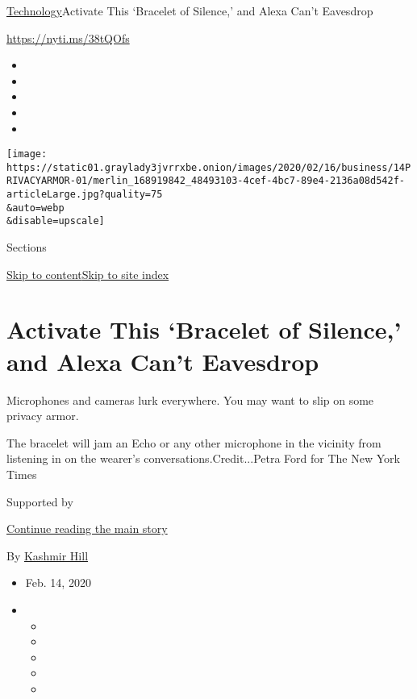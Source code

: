 \href{/section/technology}{Technology}\textbar{}Activate This `Bracelet
of Silence,' and Alexa Can't Eavesdrop

\url{https://nyti.ms/38tQOfs}

\begin{itemize}
\item
\item
\item
\item
\item
\end{itemize}

\texttt{[image: https://static01.graylady3jvrrxbe.onion/images/2020/02/16/business/14PRIVACYARMOR-01/merlin\_168919842\_48493103-4cef-4bc7-89e4-2136a08d542f-articleLarge.jpg?quality=75\\\&auto=webp\\\&disable=upscale]}

Sections

\protect\hyperlink{site-content}{Skip to
content}\protect\hyperlink{site-index}{Skip to site index}

\hypertarget{activate-this-bracelet-of-silence-and-alexa-cant-eavesdrop}{%
\section{Activate This `Bracelet of Silence,' and Alexa Can't
Eavesdrop}\label{activate-this-bracelet-of-silence-and-alexa-cant-eavesdrop}}

Microphones and cameras lurk everywhere. You may want to slip on some
privacy armor.

The bracelet will jam an Echo or any other microphone in the vicinity
from listening in on the wearer's conversations.Credit...Petra Ford for
The New York Times

Supported by

\protect\hyperlink{after-sponsor}{Continue reading the main story}

By \href{https://www.nytimes3xbfgragh.onion/by/kashmir-hill}{Kashmir
Hill}

\begin{itemize}
\item
  Feb. 14, 2020
\item
  \begin{itemize}
  \item
  \item
  \item
  \item
  \item
  \end{itemize}
\end{itemize}

